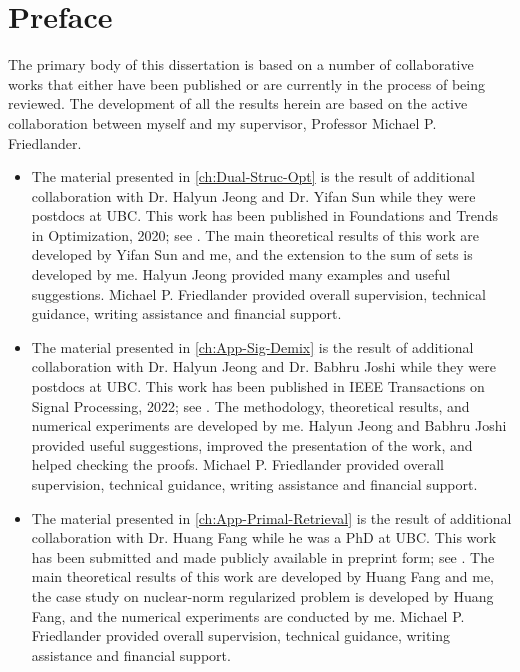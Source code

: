 
\chapter{Preface}

The primary body of this dissertation is based on a number of collaborative works that either have been published or are currently in the process of being reviewed. The development of all the results herein are based on the active collaboration between myself and my supervisor, Professor Michael P. Friedlander.

\begin{itemize}
    \item The material presented in \autoref{ch:Dual-Struc-Opt} is the result of additional collaboration with Dr. Halyun Jeong and Dr. Yifan Sun while they were postdocs at UBC. This work has been published in Foundations and Trends in Optimization, 2020; see \citet{fan2019alignment}. The main theoretical results of this work are developed by Yifan Sun and me, and the extension to the sum of sets is developed by me. Halyun Jeong provided many examples and useful suggestions. Michael P. Friedlander provided overall supervision, technical guidance, writing assistance and financial support. 
    \item The material presented in \autoref{ch:App-Sig-Demix} is the result of additional collaboration with Dr. Halyun Jeong and Dr. Babhru Joshi while they were postdocs at UBC. This work has been published in IEEE Transactions on Signal Processing, 2022; see \citet{fan2020polar}. The methodology, theoretical results, and numerical experiments are developed by me. Halyun Jeong and Babhru Joshi provided useful suggestions, improved the presentation of the work, and helped checking the proofs. Michael P. Friedlander provided overall supervision, technical guidance, writing assistance and financial support.
    \item The material presented in \autoref{ch:App-Primal-Retrieval} is the result of additional collaboration with Dr. Huang Fang while he was a PhD at UBC. This work has been submitted and made publicly available in preprint form; see \citet{fan2021safe}. The main theoretical results of this work are developed by Huang Fang and me, the case study on nuclear-norm regularized problem is developed by Huang Fang, and the numerical experiments are conducted by me. Michael P. Friedlander provided overall supervision, technical guidance, writing assistance and financial support.

\end{itemize}
